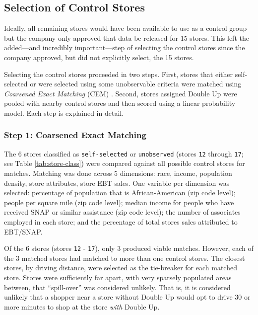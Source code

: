 \documentclass[12pt,letterpaperpaper,]{book}
\begin{document}
\subsection*{Selection of Control
Stores}\label{selection-of-control-stores}

Ideally, all remaining stores would have been available to use as a
control group but the company only approved that data be released for 15
stores. This left the added---and incredibly important---step of
selecting the control stores since the company approved, but did not
explicitly select, the 15 stores.

Selecting the control stores proceeded in two steps. First, stores that
either self-selected or were selected using some unobservable criteria
were matched using \emph{Coarsened Exact Matching} (CEM)
\citep{iacus_causal_2011}. Second, stores assigned Double Up were pooled
with nearby control stores and then scored using a linear probability
model. Each step is explained in detail.

\subsubsection*{Step 1: Coarsened Exact
Matching}\label{step-1-coarsened-exact-matching}

The 6 stores classified as \texttt{self-selected} or \texttt{unobserved}
(stores \texttt{12} through \texttt{17}; see Table
\ref{tab:store-class}) were compared against all possible control stores
for matches. Matching was done across 5 dimensions: race, income,
population density, store attributes, store EBT sales. One variable per
dimension was selected: percentage of population that is
African-American (zip code level); people per square mile (zip code
level); median income for people who have received SNAP or similar
assistance (zip code level); the number of associates employed in each
store; and the percentage of total stores sales attributed to EBT/SNAP.

Of the 6 stores (stores \texttt{12} - \texttt{17}), only 3 produced
viable matches. However, each of the 3 matched stores had matched to
more than one control stores. The closest stores, by driving distance,
were selected as the tie-breaker for each matched store. Stores were
sufficiently far apart, with very sparsely populated areas between, that
``spill-over'' was considered unlikely. That is, it is considered
unlikely that a shopper near a store without Double Up would opt to
drive 30 or more minutes to shop at the store \emph{with} Double Up.
\end{document}
